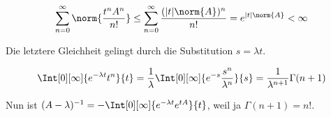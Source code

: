 \begin{solution}
\begin{align*}
  \sum_{n=0}^\infty
  \norm{\frac{t^n A^n}{n!}}
  \leq
  \sum_{n=0}^\infty
  \frac{(|t| \norm{A})^n}{n!}
  =
  e^{|t| \norm{A}} < \infty
\end{align*}

Die letztere Gleichheit gelingt durch die Substitution $s = \lambda t$.

\begin{align*}
  \Int[0][\infty]{e^{-\lambda t} t^n}{t}
  =
  \frac{1}{\lambda}
  \Int
  [0][\infty]
  {
    e^{-s}
    \frac{s^n}{\lambda^n}
  }{s}
  =
  \frac{1}{\lambda^{n + 1}}
  \Gamma(n+1)
\end{align*}

Nun ist $(A - \lambda)^{-1} = -\Int[0][\infty]{e^{-\lambda t} e^{t A}}{t}$, weil ja $\Gamma(n+1) = n!$.

\end{solution}
